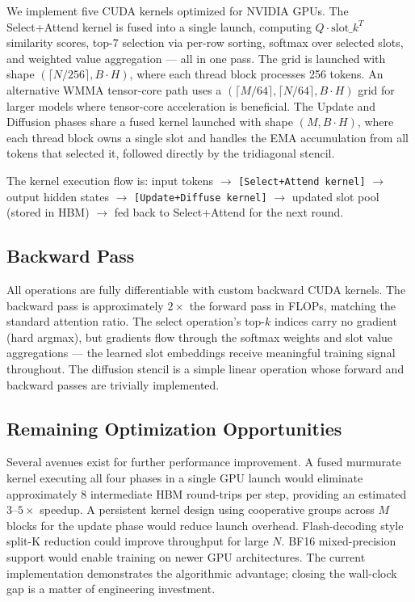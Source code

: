 \documentclass{article}
\begin{document}
We implement five CUDA kernels optimized for NVIDIA GPUs. The Select+Attend kernel is fused into a single launch, computing $Q \cdot \mathrm{slot\_}k^T$ similarity scores, top-7 selection via per-row sorting, softmax over selected slots, and weighted value aggregation — all in one pass. The grid is launched with shape $(\lceil N/256 \rceil, B \cdot H)$, where each thread block processes 256 tokens. An alternative WMMA tensor-core path uses a $(\lceil M/64 \rceil, \lceil N/64 \rceil, B \cdot H)$ grid for larger models where tensor-core acceleration is beneficial. The Update and Diffusion phases share a fused kernel launched with shape $(M, B \cdot H)$, where each thread block owns a single slot and handles the EMA accumulation from all tokens that selected it, followed directly by the tridiagonal stencil.

The kernel execution flow is: input tokens $\rightarrow$ \texttt{[Select+Attend kernel]} $\rightarrow$ output hidden states $\rightarrow$ \texttt{[Update+Diffuse kernel]} $\rightarrow$ updated slot pool (stored in HBM) $\rightarrow$ fed back to Select+Attend for the next round.

\subsection{Backward Pass}

All operations are fully differentiable with custom backward CUDA kernels. The backward pass is approximately $2\times$ the forward pass in FLOPs, matching the standard attention ratio. The select operation's top-$k$ indices carry no gradient (hard argmax), but gradients flow through the softmax weights and slot value aggregations — the learned slot embeddings receive meaningful training signal throughout. The diffusion stencil is a simple linear operation whose forward and backward passes are trivially implemented.

\subsection{Remaining Optimization Opportunities}

Several avenues exist for further performance improvement. A fused murmurate kernel executing all four phases in a single GPU launch would eliminate approximately 8 intermediate HBM round-trips per step, providing an estimated $3$--$5\times$ speedup. A persistent kernel design using cooperative groups across $M$ blocks for the update phase would reduce launch overhead. Flash-decoding style split-K reduction could improve throughput for large $N$. BF16 mixed-precision support would enable training on newer GPU architectures. The current implementation demonstrates the algorithmic advantage; closing the wall-clock gap is a matter of engineering investment.
\end{document}
